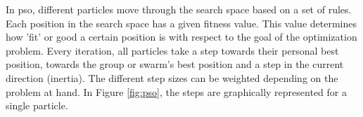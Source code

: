 In \gls{pso}, different particles move through the search space based on a set of rules. Each position in the search space has a given fitness value. This value determines how 'fit' or good a certain position is with respect to the goal of the optimization problem. Every iteration, all particles take a step towards their personal best position, towards the group or swarm's best position and a step in the current direction (inertia). The different step sizes can be weighted depending on the problem at hand. In Figure \ref{fig:pso}, the steps are graphically represented for a single particle.   

\begin{figure}
\centering
\begin{tikzpicture}[x=0.75pt,y=0.75pt,yscale=-1,xscale=1]



\end{tikzpicture}
\end{figure}
